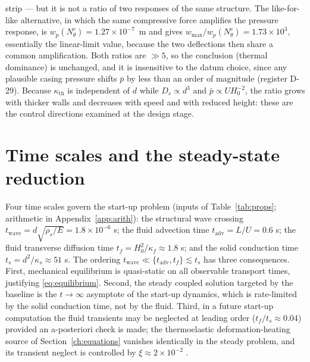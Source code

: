 strip --- but it is not a ratio of two responses of the same structure. The like-for-like
alternative, in which the same compressive force amplifies the pressure response, is
$w_p(N_\theta^c)=1.27\times10^{-7}$~m and gives $w_{\max}/w_p(N_\theta^c)=1.73\times10^{3}$,
essentially the linear-limit value, because the two deflections then share a common amplification.
Both ratios are $\gg5$, so the conclusion (thermal dominance) is unchanged, and it is insensitive
to the datum choice, since any plausible casing pressure shifts $\bar p$ by less than an order of
magnitude (register D-29).
Because $\kappa_{\mathrm{th}}$ is independent of $d$ while $D_s\propto d^3$ and
$\bar p\propto UH_0^{-2}$, the ratio grows with thicker walls and decreases with speed and with
reduced height: these are the control directions examined at the design stage.

\section{Time scales and the steady-state reduction}
\label{sec:steadytimes}
Four time scales govern the start-up problem (inputs of Table~\ref{tab:props}; arithmetic in
Appendix~\ref{app:arith}): the structural wave crossing
$t_{\mathrm{wave}}=d\sqrt{\rho_s/E}=1.8\times10^{-6}$ s; the fluid advection time
$t_{\mathrm{adv}}=L/U=0.6$ s; the fluid transverse diffusion time
$t_{f}=H_0^2/\kappa_f\approx1.8$ s; and the solid conduction time
$t_{s}=d^2/\kappa_s\approx51$ s. The ordering
$t_{\mathrm{wave}}\ll\{t_{\mathrm{adv}},t_{f}\}\lesssim t_s$ has three consequences. First,
mechanical equilibrium is quasi-static on all observable transport times, justifying
\eqref{eq:equilibrium}. Second, the steady coupled solution targeted by the baseline is the
$t\to\infty$ asymptote of the start-up dynamics, which is rate-limited by the solid conduction
time, not by the fluid. Third, in a future start-up computation the fluid transients may be
neglected at leading order ($t_f/t_s\approx0.04$) provided an a-posteriori check is made; the
thermoelastic deformation-heating source of Section~\ref{ch:equations} vanishes identically in the
steady problem, and its transient neglect is controlled by $\xi\approx2\times10^{-2}$
\cite{boley1960theory}.
